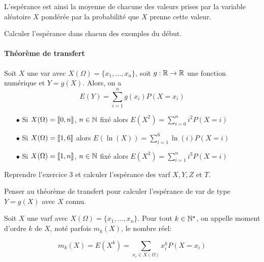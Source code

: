 \documentclass[a4paper, 11pt]{article}
\begin{document}
\begin{rem}
 L'esp\'erance est ainsi la moyenne de chacune des valeurs prises par la variable al\'eatoire $X$ pond\'er\'ee par la probabilit\'e que $X$ prenne cette valeur.
\end{rem}

\begin{exemple}
Calculer l'esp\'erance dans chacun des exemples du d\'ebut.

\end{exemple}




\paragraph{Th\'eor\`{e}me de transfert}

 

\begin{theorem} 
Soit $X$ une var avec $X(\Omega)=\lbrace x_1,\dots, x_n\rbrace$, soit $g: \mathbb{R}\rightarrow \mathbb{R}$ une fonction num\'erique et $Y=g(X)$. Alors, on a
$$E(Y)= \sum_{i=1}^n g(x_i) P(X=x_i)$$

\end{theorem}
 


\begin{exemples}
\begin{itemize}
\item[$\bullet$] Si $X(\Omega)=\llbracket  0,n\rrbracket$, $n\in\mathbb{N}$ fix\'e alors $E(X^2)= \sum_{i=0}^n i^2 P(X=i)$
\item[$\bullet$] Si $X(\Omega)=\llbracket  1,6\rrbracket$ alors $E(\ln{(X)})= \sum_{i=1}^6 \ln(i) P(X=i) $
\item[$\bullet$] Si $X(\Omega)=\llbracket  1,n\rrbracket$, $n\in\mathbb{N}$ fix\'e alors $E(X^3)= \sum_{i=1}^n i^3 P(X=i)$
\end{itemize}
\end{exemples}

{\footnotesize \begin{exercice} 
Reprendre l'exercice 3 et calculer l'esp\'erance des varf $X,Y,Z$ et $T$.
\end{exercice}}\vsec\vsec



Penser au th\'eor\`{e}me de transfert pour calculer l'esp\'erance de var de type $Y=g(X)$ avec $X$ connu.


\begin{defi} 
Soit $X$ une varf avec $X(\Omega)=\lbrace x_1,\dots, x_n\rbrace$. \vsec
 Pour tout $k\in\mathbb{N}^{\star}$, on appelle moment d'ordre $k$ de $X$, not\'e parfois $m_k(X)$, le nombre r\'eel: 

 $$m_k(X)=E(X^k)= \sum_{x_i\in X(\Omega)} x_i^k P(X=x_i)$$
 

\end{defi}
 
\end{document}
